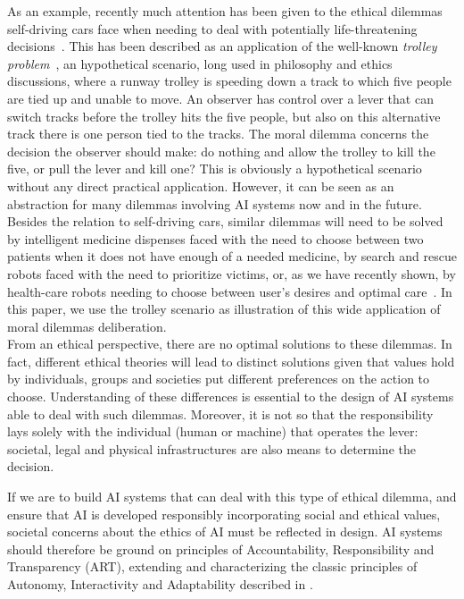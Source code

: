 \documentclass[twocolumn]{article}
\begin{document}
As an example, recently much attention has been given to the ethical dilemmas self-driving cars face when needing to deal with potentially life-threatening decisions~\cite{Bonnefon1573}. This has been described as an application of the well-known \textit{trolley problem}~\cite{foot1967problem}, an hypothetical scenario, long used in philosophy and ethics discussions, where a runway trolley is speeding down a track to which five people are tied up and unable to move. An observer has control over a lever that can switch tracks before the trolley hits the five people, but also on this alternative track there is one person tied to the tracks. The moral dilemma concerns the decision the observer should make: do nothing and allow the trolley to kill the five, or pull the lever and kill one? This is obviously a hypothetical scenario without any direct practical application. However, it can be seen as an abstraction for many dilemmas involving AI systems now and in the future. Besides the relation to self-driving cars, similar dilemmas will need to be solved by intelligent medicine dispenses faced with the need to choose between two patients when it does not have enough of a needed medicine, by search and rescue robots faced with the need to prioritize victims, or, as we have recently shown, by health-care robots needing to choose between user's desires and optimal care~\cite{pizza2017icai}. In this paper, we use the trolley scenario as illustration of this wide application of moral dilemmas deliberation.\\
From an ethical perspective, there are no optimal solutions to these dilemmas. In fact, different ethical theories will lead to distinct solutions given that values hold by individuals, groups and societies put different preferences on the action to choose. Understanding of these differences is essential to the design of AI systems able to deal with such dilemmas. Moreover, it is not so that the responsibility lays solely with the individual (human or machine) that operates the lever: societal, legal and physical infrastructures are also means to determine the decision.

If we are to build AI systems that can deal with this type of ethical dilemma, and ensure that AI is developed responsibly incorporating social and ethical values, societal concerns about the ethics of AI must be reflected in design.  AI systems should therefore be ground on  principles of Accountability, Responsibility and Transparency (ART), extending and characterizing the classic  principles of Autonomy, Interactivity and Adaptability described in \cite{floridi2004morality,russell2009norvig}.
\end{document}
